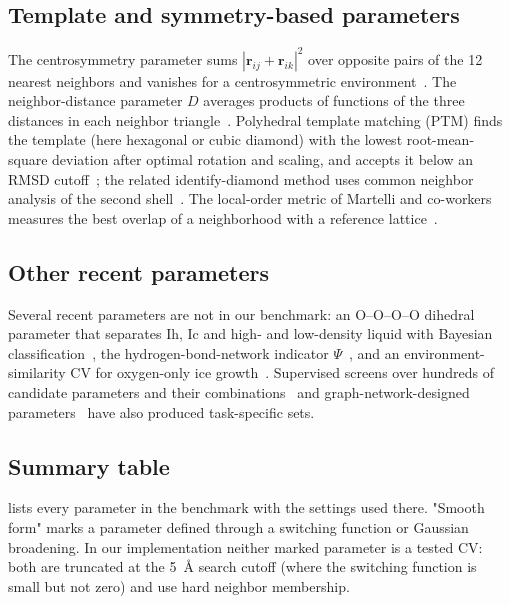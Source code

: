 \documentclass[11pt,a4paper]{article}
\begin{document}
\subsection{Template and symmetry-based parameters}
The centrosymmetry parameter sums $|\mathbf r_{ij}+\mathbf r_{ik}|^2$ over
opposite pairs of the 12 nearest neighbors and vanishes for a centrosymmetric
environment~\cite{Kelchner1998}. The neighbor-distance parameter $D$ averages
products of functions of the three distances in each neighbor
triangle~\cite{Takahashi2023}. Polyhedral template matching (PTM) finds the
template (here hexagonal or cubic diamond) with the lowest root-mean-square
deviation after optimal rotation and scaling, and accepts it below an RMSD
cutoff~\cite{Larsen2016}; the related identify-diamond method uses common
neighbor analysis of the second shell~\cite{Maras2016,Stukowski2012}. The
local-order metric of Martelli and co-workers measures the best overlap of a
neighborhood with a reference lattice~\cite{Martelli2018,Martelli2018b}.

\subsection{Other recent parameters}
Several recent parameters are not in our benchmark: an O--O--O--O dihedral
parameter that separates Ih, Ic and high- and low-density liquid with Bayesian
classification~\cite{Matsumoto2019}, the hydrogen-bond-network indicator
$\Psi$~\cite{Foffi2024}, and an environment-similarity CV for oxygen-only ice
growth~\cite{Piaggi2020}. Supervised screens over hundreds of candidate
parameters and their combinations~\cite{Doi2020,Doi2021,Doi2021b,Doi2021c,
Takahashi2023b} and graph-network-designed parameters~\cite{Ishiai2023} have
also produced task-specific sets.

\subsection{Summary table}
 lists every parameter in the benchmark with the settings
used there. "Smooth form" marks a parameter defined through a switching
function or Gaussian broadening. In our implementation neither marked
parameter is a tested CV: both are truncated at the 5~\AA{} search cutoff
(where the switching function is small but not zero) and use hard neighbor
membership.
\end{document}
